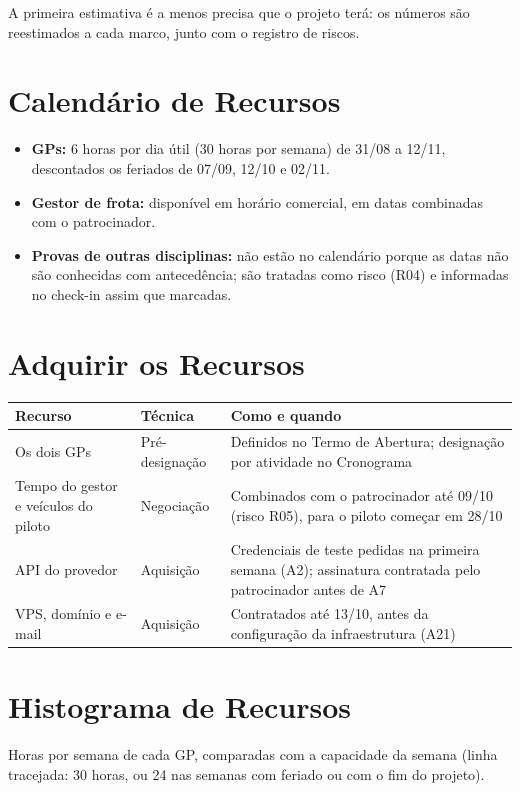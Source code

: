 \documentclass[11pt,a4paper]{article}
\begin{document}
\noindent A primeira estimativa é a menos precisa que o projeto terá: os números são reestimados a cada marco, junto com o registro de riscos.

\section{Calendário de Recursos}
\begin{itemize}[itemsep=2pt]
  \item \textbf{GPs:} 6 horas por dia útil (30 horas por semana) de 31/08 a 12/11, descontados os feriados de 07/09, 12/10 e 02/11.
  \item \textbf{Gestor de frota:} disponível em horário comercial, em datas combinadas com o patrocinador.
  \item \textbf{Provas de outras disciplinas:} não estão no calendário porque as datas não são conhecidas com antecedência; são tratadas como risco (R04) e informadas no check-in assim que marcadas.
\end{itemize}

\section{Adquirir os Recursos}
\begin{center}
\small
\begin{tabularx}{\textwidth}{>{\raggedright\arraybackslash}p{3.6cm} >{\raggedright\arraybackslash}p{2.6cm} L}
\toprule
\textbf{Recurso} & \textbf{Técnica} & \textbf{Como e quando} \\
\midrule
Os dois GPs & Pré-designação & Definidos no Termo de Abertura; designação por atividade no Cronograma \\
Tempo do gestor e veículos do piloto & Negociação & Combinados com o patrocinador até 09/10 (risco R05), para o piloto começar em 28/10 \\
API do provedor & Aquisição & Credenciais de teste pedidas na primeira semana (A2); assinatura contratada pelo patrocinador antes de A7 \\
VPS, domínio e e-mail & Aquisição & Contratados até 13/10, antes da configuração da infraestrutura (A21) \\
\bottomrule
\end{tabularx}
\end{center}

\section{Histograma de Recursos}
Horas por semana de cada GP, comparadas com a capacidade da semana (linha tracejada: 30 horas, ou 24 nas semanas com feriado ou com o fim do projeto).
\end{document}
